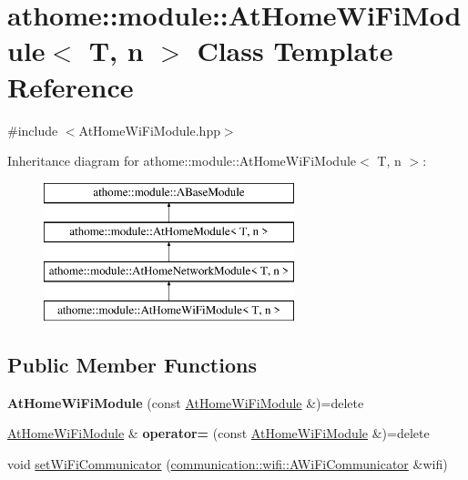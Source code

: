 \hypertarget{classathome_1_1module_1_1_at_home_wi_fi_module}{}\section{athome\+:\+:module\+:\+:At\+Home\+Wi\+Fi\+Module$<$ T, n $>$ Class Template Reference}
\label{classathome_1_1module_1_1_at_home_wi_fi_module}


{\ttfamily \#include $<$At\+Home\+Wi\+Fi\+Module.\+hpp$>$}

Inheritance diagram for athome\+:\+:module\+:\+:At\+Home\+Wi\+Fi\+Module$<$ T, n $>$\+:\begin{figure}[H]
\begin{center}
\leavevmode
\includegraphics[height=4.000000cm]{classathome_1_1module_1_1_at_home_wi_fi_module}
\end{center}
\end{figure}
\subsection*{Public Member Functions}
\begin{DoxyCompactItemize}
\item 
\mbox{\label{classathome_1_1module_1_1_at_home_wi_fi_module_af414ddecde14c57564ccff7ad898b3a0}} 
{\bfseries At\+Home\+Wi\+Fi\+Module} (const \mbox{\hyperlink{classathome_1_1module_1_1_at_home_wi_fi_module}{At\+Home\+Wi\+Fi\+Module}} \&)=delete
\item 
\mbox{\label{classathome_1_1module_1_1_at_home_wi_fi_module_af3338d83bd96103f7a3a86d5495eb465}} 
\mbox{\hyperlink{classathome_1_1module_1_1_at_home_wi_fi_module}{At\+Home\+Wi\+Fi\+Module}} \& {\bfseries operator=} (const \mbox{\hyperlink{classathome_1_1module_1_1_at_home_wi_fi_module}{At\+Home\+Wi\+Fi\+Module}} \&)=delete
\item 
void \mbox{\hyperlink{classathome_1_1module_1_1_at_home_wi_fi_module_a610d2e99c11fdd4b6afbfe65ee2e56d5}{set\+Wi\+Fi\+Communicator}} (\mbox{\hyperlink{classathome_1_1communication_1_1wifi_1_1_a_wi_fi_communicator}{communication\+::wifi\+::\+A\+Wi\+Fi\+Communicator}} \&wifi)
\end{DoxyCompactItemize}

